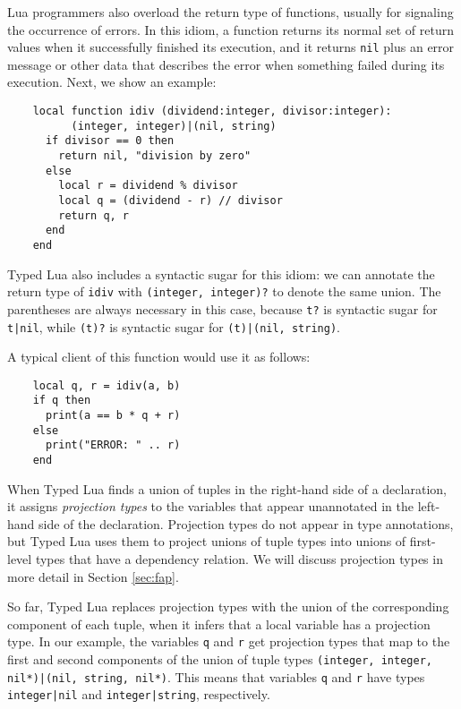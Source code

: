 Lua programmers also overload the return type of functions,
usually for signaling the occurrence of errors.
In this idiom, a function returns its normal set of return values
when it successfully finished its execution,
and it returns \texttt{nil} plus an error message or other data that
describes the error when something failed during its execution.
Next, we show an example:
\begin{verbatim}
    local function idiv (dividend:integer, divisor:integer):
          (integer, integer)|(nil, string)
      if divisor == 0 then
        return nil, "division by zero"
      else
        local r = dividend % divisor
        local q = (dividend - r) // divisor
        return q, r
      end 
    end
\end{verbatim}

Typed Lua also includes a syntactic sugar for this idiom:
we can annotate the return type of \texttt{idiv} with
\texttt{(integer, integer)?} to denote the same union.
The parentheses are always necessary in this case, because
\texttt{t?} is syntactic sugar for \texttt{t|nil},
while \texttt{(t)?} is syntactic sugar for \texttt{(t)|(nil, string)}.

A typical client of this function would use it as follows:
\begin{verbatim}
    local q, r = idiv(a, b)
    if q then
      print(a == b * q + r)
    else
      print("ERROR: " .. r)
    end
\end{verbatim}

When Typed Lua finds a union of tuples in the right-hand side of
a declaration, it assigns \emph{projection types} to the
variables that appear unannotated in the left-hand side of the
declaration.
Projection types do not appear in type annotations, but Typed Lua
uses them to project unions of tuple types into unions of
first-level types that have a dependency relation.
We will discuss projection types in more detail in Section \ref{sec:fap}.

So far, Typed Lua replaces projection types with the union of the
corresponding component of each tuple, when it infers that a local variable
has a projection type.
In our example, the variables \texttt{q} and \texttt{r} get projection
types that map to the first and second components of the union of
tuple types \texttt{(integer, integer, nil*)|(nil, string, nil*)}.
This means that variables \texttt{q} and \texttt{r} have types
\texttt{integer|nil} and \texttt{integer|string}, respectively.

